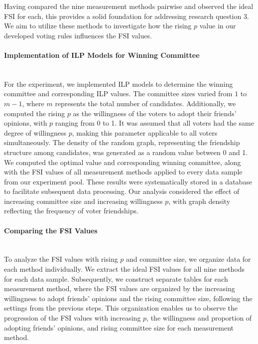 \documentclass{article}
\begin{document}
Having compared the nine measurement methods pairwise and observed the ideal FSI for each, this provides a solid foundation for addressing research question 3. We aim to utilize these methods to investigate how the rising $p$ value in our developed voting rules influences the FSI values.
\paragraph*{Implementation of ILP Models for Winning Committee}\mbox{} \\
For the experiment, we implemented ILP models to determine the winning committee and corresponding ILP values. The committee sizes varied from $1$ to $m-1$, where $m$ represents the total number of candidates. Additionally, we computed the rising $p$ as the willingness of the voters to adopt their friends' opinions, with $p$ ranging from 0 to 1. It was assumed that all voters had the same degree of willingness $p$, making this parameter applicable to all voters simultaneously. The density of the random graph, representing the friendship structure among candidates, was generated as a random value between 0 and 1. We computed the optimal value and corresponding winning committee, along with the FSI values of all measurement methods applied to every data sample from our experiment pool. These results were systematically stored in a database to facilitate subsequent data processing. Our analysis considered the effect of increasing committee size and increasing willingness $p$, with graph density reflecting the frequency of voter friendships.
\paragraph*{Comparing the FSI Values}\mbox{} \\
To analyze the FSI values with rising $p$ and committee size, we organize data for each method individually. We extract the ideal FSI values for all nine methods for each data sample. Subsequently, we construct separate tables for each measurement method, where the FSI values are organized by the increasing willingness to adopt friends' opinions and the rising committee size, following the settings from the previous steps. This organization enables us to observe the progression of the FSI values with increasing $p$, the willingness and proportion of adopting friends' opinions, and rising committee size for each measurement method.
\end{document}
